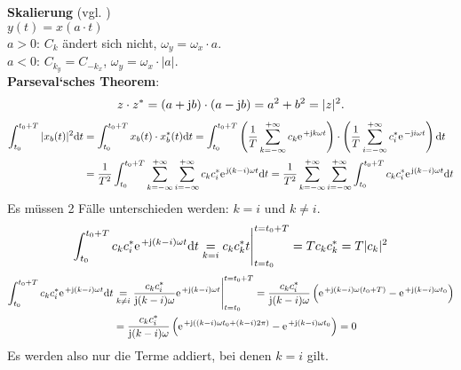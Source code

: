 \documentclass[11pt,a4paper,DIV=12]{scrartcl}
\begin{document}
%
\textbf{Skalierung} (vgl. \cite[Kap. 1, S. 22]{Butz2012})\\
$y(t) = x(a\cdot t)$	\\
$a>0$: $C_k$ ändert sich nicht, $\omega_y = \omega_x \cdot a$.\\
$a<0$: $C_{k_y} = C_{-k_x}$, $\omega_y = \omega_x \cdot |a|$.\\
\textbf{Parseval`sches Theorem}:
\begin{align}
	z\cdot z^*=(a+\im b)\cdot (a-\im b)=a^2+b^2=|z|^2.
\end{align}
%
%
\begin{align}
	\int_{t_0}^{t_0+T}|x_b(t)|^2\diff t
	&=\int_{t_0}^{t_0+T}x_b(t)\cdot x_b^*(t)\diff t
	=\int_{t_0}^{t_0+T}\left (\frac{1}{T}\sum_{k=-\infty}^{+\infty}c_k\e^{+\im k \omega t}\right )\cdot \left (\frac{1}{T}\sum_{i=-\infty}^{+\infty}c_i^*\e^{-\im i \omega t}\right )\diff t\nonumber \\
	&=\frac{1}{T^2}\int_{t_0}^{t_0+T}\sum_{k=-\infty}^{+\infty}\sum_{i=-\infty}^{+\infty}c_kc_i^*\e^{\im (k-i)\omega t}\diff t =\frac{1}{T^2}\sum_{k=-\infty}^{+\infty}\sum_{i=-\infty}^{+\infty}\int_{t_0}^{t_0+T}c_kc_i^*\e^{\im (k-i)\omega t}\diff t
\end{align}
%
Es müssen 2 Fälle unterschieden werden: $k=i$ und $k\neq i$.
%
\begin{align}
	\int_{t_0}^{t_0+T}c_kc_i^*\e^{+\im (k-i)\omega t}\diff t \underset{k=i}{=}c_kc_k^*t\Bigg |_{t=t_0}^{t=t_0+T}=Tc_kc_k^*=T|c_k|^2
\end{align}
%
\begin{align}
	\int_{t_0}^{t_0+T}c_kc_i^*\e^{+\im (k-i)\omega t}\diff t
	&\underset{k\neq i}{=}\frac{c_kc_i^*}{\im (k-i) \omega }\e^{+\im (k-i)\omega t}\Bigg |_{t=t_0}^{t=t_0+T}
	=\frac{c_kc_i^*}{\im (k-i) \omega }\left (\e^{+\im (k-i)\omega (t_0+T)}-\e^{+\im (k-i)\omega t_0}\right )\nonumber \\
	&=\frac{c_kc_i^*}{\im (k-i) \omega }\left (\e^{+\im ((k-i)\omega t_0+(k-i)2\pi)}-\e^{+\im (k-i)\omega t_0}\right )=0
\end{align}
Es werden also nur die Terme addiert, bei denen $k=i$ gilt.
%
\end{document}
